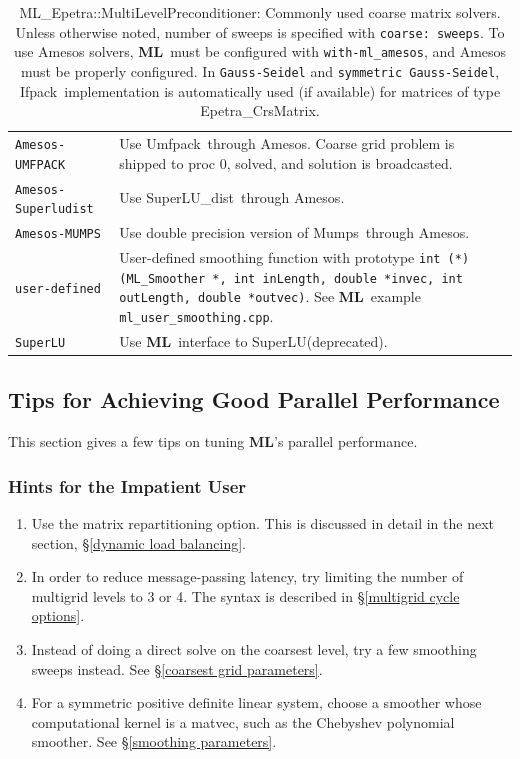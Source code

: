 \documentclass{article}[11pt]
\newcommand{\ML}     {{\bf ML}}
\newcommand{\amesos}  {{\sc Amesos}}
\newcommand{\umfpack}  {{\sc Umfpack}}
\newcommand{\superlu}  {{\sc SuperLU}}
\newcommand{\superludist}  {{\sc SuperLU\_dist}}
\newcommand{\mumps}  {{\sc Mumps}}
\newcommand{\ifpack}  {{\sc Ifpack}}
\newcommand{\be}  {\begin{enumerate}}
\newcommand{\ee}  {\end{enumerate}}
\begin{document}
\begin{table}[tbh]
\begin{center}
\begin{tabular}{ | p{4.5cm} | p{10cm} | }
\verb!Amesos-UMFPACK! & Use \umfpack\ through \amesos. Coarse grid problem is shipped to
 proc 0, solved, and solution is broadcasted. \\
\verb!Amesos-Superludist! & Use \superludist\ through \amesos. \\
\verb!Amesos-MUMPS! & Use double precision version of \mumps~through
\amesos. \\
\verb!user-defined! & User-defined smoothing function with prototype
{\tt int (*)(ML\_Smoother *, int inLength, double *invec, int outLength,
 double *outvec)}.  See \ML\ example {\tt ml\_user\_smoothing.cpp}.\\
\verb!SuperLU! & Use \ML\ interface to \superlu (deprecated). \\
\hline
\end{tabular}
\caption{{\sf ML\_Epetra::MultiLevelPreconditioner}: Commonly used coarse
matrix solvers.
Unless otherwise noted, number of sweeps is specified with {\tt coarse: sweeps}.
To use Amesos solvers, 
\ML\ must be configured with {\tt with-ml\_amesos}, and Amesos must
be properly configured.
In {\tt Gauss-Seidel} and {\tt symmetric Gauss-Seidel},
\ifpack\ implementation is automatically used (if available)
for matrices of type Epetra\_CrsMatrix.
}
\label{tab:ml:coarse}
\end{center}
\end{table}
%
\subsection{Tips for Achieving Good Parallel Performance}
\label{parallel performance}
%
This section gives a few tips on tuning \ML's parallel performance.

\subsubsection{Hints for the Impatient User}

\be
   \item Use the matrix repartitioning option.   This is discussed in detail
in the next section, \S\ref{dynamic load balancing}.
   \item In order to reduce message-passing latency, try limiting the number
of multigrid levels to 3 or 4.  The syntax is described in
\S\ref{multigrid cycle options}.
   \item Instead of doing a direct solve on the coarsest level, try a few
smoothing sweeps instead.  See \S\ref{coarsest grid parameters}.
   \item For a symmetric positive definite linear system, choose a
smoother  whose computational kernel is a matvec, such as the Chebyshev
polynomial smoother.  See \S\ref{smoothing parameters}.
\ee
\end{document}
